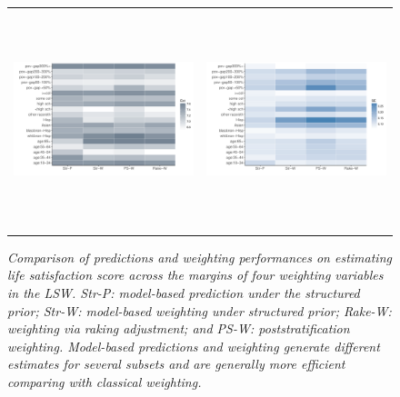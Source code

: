 \documentclass[11pt]{article}
\begin{document}
 \begin{figure}
\centering
\begin{tabular}{cc}
\includegraphics[width=.475\textwidth,height=2.5in]{plot/lsw_mar_est.pdf}&\includegraphics[width=.475\textwidth,height=2.5in]{plot/lsw_mar_se.pdf}
\end{tabular}
\caption{\em Comparison of predictions and weighting performances on estimating life satisfaction score across the margins of four weighting variables in the LSW. Str-P: model-based prediction under the structured prior; Str-W: model-based weighting under structured prior; Rake-W: weighting via raking adjustment; and PS-W: poststratification weighting. Model-based predictions and weighting generate different estimates for several subsets and are generally more efficient comparing with classical weighting.}
\label{lsw-mar}
\end{figure} 
\end{document}
